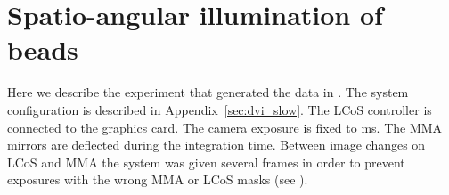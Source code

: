 \section{Spatio-angular illumination of beads}
Here we describe the experiment that generated the data in
. The system configuration is
described in Appendix~\ref{sec:dvi_slow}. The LCoS controller is
connected to the graphics card. The camera exposure is fixed to
\unit[16]{ms}. The MMA mirrors are deflected during the integration
time. Between image changes on LCoS and MMA the system was given
several frames in order to prevent exposures with the wrong MMA or
LCoS masks (see ).
